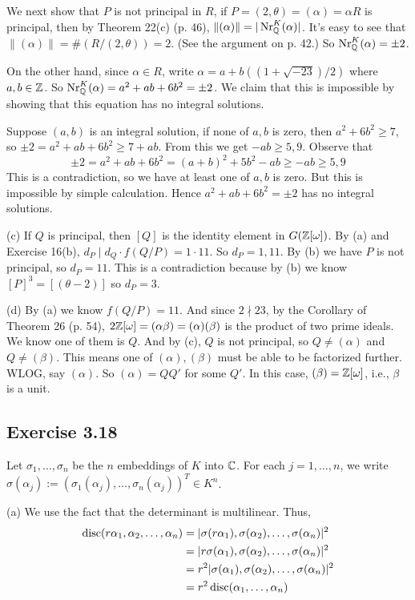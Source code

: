 \documentclass[../Marcus.tex]{subfiles}
\begin{document}
We next show that $P$ is not principal in $R$, if $P=(2,\theta)=(\alpha)=\alpha R$ is principal, then by Theorem 22(c) (p. 46), $\|(\alpha)\|=|\operatorname{Nr}^K_{\mathbb{Q}}(\alpha)|$. It's easy to see that $\|(\alpha)\|=\#(R/(2,\theta))=2$. (See the argument on p. 42.) So $\operatorname{Nr}^K_{\mathbb{Q}}(\alpha)=\pm 2$.

On the other hand, since $\alpha\in R$, write $\alpha=a+b((1+\sqrt{-23})/2)$ where $a,b\in\mathbb{Z}$. So $\operatorname{Nr}^K_{\mathbb{Q}}(\alpha)=a^2+ab+6b^2=\pm 2$. We claim that this is impossible by showing that this equation has no integral solutions.

Suppose $(a,b)$ is an integral solution, if none of $a,b$ is zero, then $a^2+6b^2\geq 7$, so $\pm2 = a^2+ab+6b^2 \geq 7+ab$. From this we get $-ab\geq 5,9$. Observe that $$\pm2 = a^2+ab+6b^2 = (a+b)^2+5b^2-ab \geq -ab \geq 5,9$$
This is a contradiction, so we have at least one of $a,b$ is zero. But this is impossible by simple calculation. Hence $a^2+ab+6b^2=\pm2$ has no integral solutions.

(c) If $Q$ is principal, then $[Q]$ is the identity element in $G(\mathbb{Z}[\omega])$. By (a) and Exercise 16(b), $d_P\mid d_Q\cdot f(Q/P)=1\cdot 11$. So $d_P=1,11$. By (b) we have $P$ is not principal, so $d_P=11$. This is a contradiction because by (b) we know $[P]^3=[(\theta-2)]$ so $d_P=3$.

(d) By (a) we know $f(Q/P)=11$. And since $2\nmid 23$, by the Corollary of Theorem 26 (p. 54), $2\mathbb{Z}[\omega]=(\alpha\beta)=(\alpha)(\beta)$ is the product of two prime ideals. We know one of them is $Q$. And by (c), $Q$ is not principal, so $Q\neq (\alpha)$ and $Q\neq(\beta)$. This means one of $(\alpha),(\beta)$ must be able to be factorized further. WLOG, say $(\alpha)$. So $(\alpha)=QQ'$ for some $Q'$. In this case, $(\beta)=\mathbb{Z}[\omega]$, i.e., $\beta$ is a unit.

\subsection*{Exercise 3.18}

Let $\sigma_1,\ldots,\sigma_n$ be the $n$ embeddings of $K$ into $\mathbb{C}$. For each $j=1,\ldots,n$, we write $\sigma(\alpha_j):=(\sigma_1(\alpha_j),\ldots,\sigma_n(\alpha_j))^T\in K^n$.

(a) We use the fact that the determinant is multilinear. Thus,
\begin{align*}
    \operatorname{disc}(r\alpha_1,\alpha_2,\ldots,\alpha_n) &= |\sigma(r\alpha_1),\sigma(\alpha_2),\ldots,\sigma(\alpha_n)|^2 \\
    &= |r\sigma(\alpha_1),\sigma(\alpha_2),\ldots,\sigma(\alpha_n)|^2 \\
    &= r^2|\sigma(\alpha_1),\sigma(\alpha_2),\ldots,\sigma(\alpha_n)|^2 \\
    &= r^2\operatorname{disc}(\alpha_1,\ldots,\alpha_n)
\end{align*}
\end{document}
